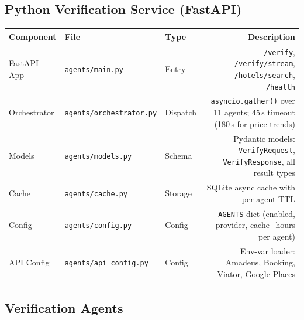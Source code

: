 \documentclass[11pt,a4paper]{article}
\begin{document}
\subsection{Python Verification Service (FastAPI)}

{\small
\begin{tabularx}{\textwidth}{@{}L{2.4cm}L{3.6cm}L{1.6cm}R@{}}
\toprule
\textbf{Component} & \textbf{File} & \textbf{Type} & \textbf{Description} \\
\midrule
FastAPI App       & \texttt{agents/main.py}          & Entry    & \texttt{/verify}, \texttt{/verify/stream}, \texttt{/hotels/search}, \texttt{/health} \\[4pt]
Orchestrator      & \texttt{agents/\allowbreak orchestrator.py}   & Dispatch & \texttt{asyncio.gather()} over 11 agents; 45\,s timeout (180\,s for price trends) \\[4pt]
Models            & \texttt{agents/models.py}         & Schema   & Pydantic models: \texttt{VerifyRequest}, \texttt{VerifyResponse}, all result types \\[4pt]
Cache             & \texttt{agents/cache.py}          & Storage  & SQLite async cache with per-agent TTL \\[4pt]
Config            & \texttt{agents/config.py}         & Config   & \texttt{AGENTS} dict (enabled, provider, cache\_hours per agent) \\[4pt]
API Config        & \texttt{agents/\allowbreak api\_config.py}    & Config   & Env-var loader: Amadeus, Booking, Viator, Google Places \\
\bottomrule
\end{tabularx}}

\subsection{Verification Agents}
\end{document}
